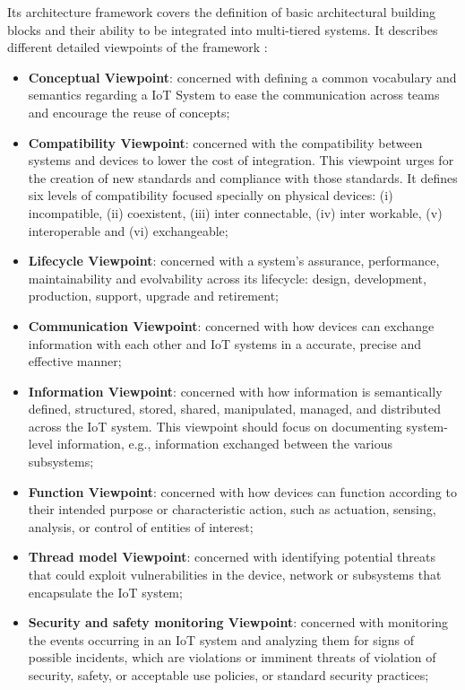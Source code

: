 Its architecture framework covers the definition of basic architectural building blocks and their ability to be integrated into multi-tiered systems. It describes different detailed viewpoints of the framework \parencite{9032420}:

\begin{itemize}
    \item \textbf{Conceptual Viewpoint}: concerned with defining a common vocabulary and semantics regarding a \gls{IoT} System to ease the communication across teams and encourage the reuse of concepts;
    \item \textbf{Compatibility Viewpoint}: concerned with the compatibility between systems and devices to lower the cost of integration. This viewpoint urges for the creation of new standards and compliance with those standards. It defines six levels of compatibility focused specially on physical devices: (i) incompatible, (ii) coexistent, (iii) inter connectable, (iv) inter workable, (v) interoperable and (vi) exchangeable;
    \item \textbf{Lifecycle Viewpoint}: concerned with a system's assurance, performance, maintainability and evolvability across its lifecycle: design, development, production, support, upgrade and retirement; 
    \item \textbf{Communication Viewpoint}: concerned with how devices can exchange information with each other and \gls{IoT} systems in a accurate, precise and effective manner;
    \item \textbf{Information Viewpoint}: concerned with how information is semantically defined, structured, stored, shared, manipulated, managed, and distributed across the IoT system. This viewpoint should focus on documenting system-level information, e.g., information exchanged between the various subsystems;
    \item \textbf{Function Viewpoint}: concerned with how devices can function according to their intended purpose or characteristic action, such as actuation, sensing, analysis, or control of entities of interest; 
    \item \textbf{Thread model Viewpoint}: concerned with identifying potential threats that could exploit vulnerabilities in the device, network or subsystems that encapsulate the \gls{IoT} system;
    \item \textbf{Security and safety monitoring Viewpoint}: concerned with monitoring the events occurring in an \gls{IoT} system and analyzing them for signs of possible incidents, which are violations or imminent threats of violation of security, safety, or acceptable use policies, or standard security practices;

\end{itemize}
